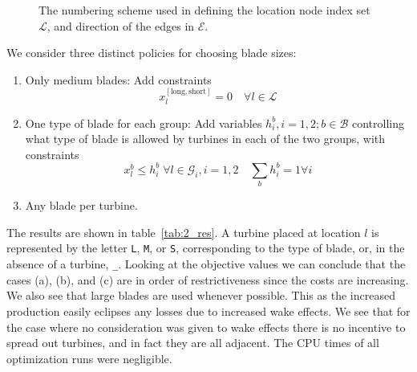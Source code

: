 \documentclass{article}
\begin{document}
\begin{figure}
	\centering
	\def\svgwidth{0.6\textwidth}
	
	\caption{The numbering scheme used in defining the location node index set $\mathcal L$, and direction of the edges in $\mathcal E$. \label{fig:loc_numbering}}
\end{figure}

We consider three distinct policies for choosing blade sizes:
\begin{enumerate}[label=(\alph*)]
	\item Only medium blades: Add constraints
		$$ x_l^{[\text{long}, \text{short}]} = 0 \quad \forall l \in \mathcal L $$
	\item One type of blade for each group:
		Add variables $h_i^b, i = 1, 2; b \in \mathcal B$
		controlling what type of blade is allowed by turbines
		in each of the two groups,
		with constraints
		$$ x_l^b \le h_i^b \; \forall l \in \mathcal G_i, i = 1,2 \quad \sum_b h_i^b = 1 \forall i $$
	\item Any blade per turbine.
\end{enumerate}
The results are shown in table~\ref{tab:2_res}.
A turbine placed at location $l$ is represented
by the letter \texttt L, \texttt M, or \texttt S,
corresponding to the type of blade, or,
in the absence of a turbine, \texttt \_.
Looking at the objective values we can conclude that
the cases (a), (b), and (c) are in order of restrictiveness
since the costs are increasing.
We also see that large blades are used whenever possible. 
This as the increased production easily eclipses any losses due to increased wake effects.  
We see that for the case where no consideration was
given to wake effects there is no incentive to spread out turbines,
and in fact they are all adjacent.
The CPU times of all optimization runs were negligible.
\end{document}
